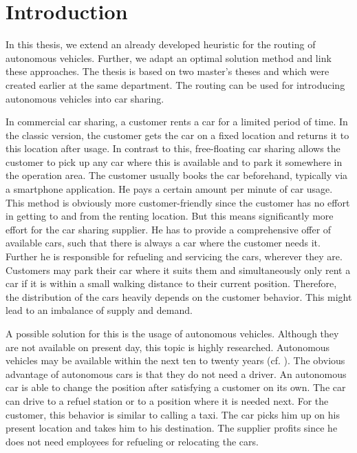 \chapter{Introduction}
\label{ch:introduction}


In this thesis, we extend an already developed heuristic for the routing of autonomous vehicles. Further, we adapt an optimal solution method and link these approaches. The thesis is based on two master's theses \cite{Kaiser} and \cite{Knoll} which were created earlier at the same department. The routing can be used for introducing autonomous vehicles into car sharing.

In commercial car sharing, a customer rents a car for a limited period of time. In the classic version, the customer gets the car on a fixed location and returns it to this location after usage. In contrast to this, free-floating car sharing allows the customer to pick up any car where this is available and to park it somewhere in the operation area. The customer usually books the car beforehand, typically via a smartphone application. He pays a certain amount per minute of car usage. This method is obviously more customer-friendly since the customer has no effort in getting to and from the renting location. But this means significantly more effort for the car sharing supplier. He has to provide a comprehensive offer of available cars, such that there is always a car where the customer needs it. Further he is responsible for refueling and servicing the cars, wherever they are. Customers may park their car where it suits them and simultaneously only rent a car if it is within a small walking distance to their current position. Therefore, the distribution of the cars heavily depends on the customer behavior. This might lead to an imbalance of supply and demand.

A possible solution for this is the usage of autonomous vehicles. Although they are not available on present day, this topic is highly researched. Autonomous vehicles may be available within the next ten to twenty years (cf. \cite{Hauser}). The obvious advantage of autonomous cars is that they do not need a driver. An autonomous car is able to change the position after satisfying a customer on its own. The car can drive to a refuel station or to a position where it is needed next. For the customer, this behavior is similar to calling a taxi. The car picks him up on his present location and takes him to his destination. The supplier profits since he does not need employees for refueling or relocating the cars.

